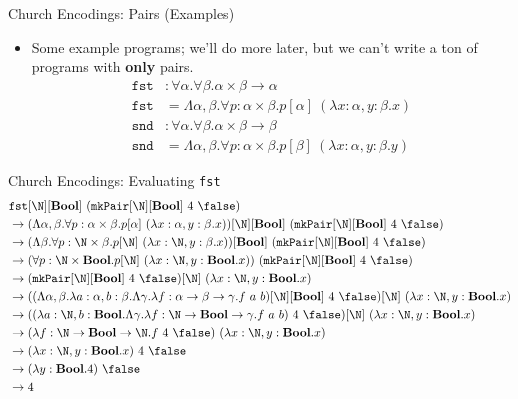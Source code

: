\documentclass[leqno,presentation,usenames,dvipsnames]{beamer}
\newcommand{\bool}{\textbf{Bool}}
\begin{document}
\begin{frame}[fragile]{Church Encodings: Pairs (Examples)}
    \begin{itemize}
        \item Some example programs; we'll do more later, but we can't write a ton of programs with \textbf{only} pairs.
\begin{align*}
    \texttt{fst} & : \forall \alpha. \forall \beta. \alpha \times \beta \to \alpha \\
    \texttt{fst} & = \Lambda \alpha, \beta. \forall p : \alpha \times \beta. p[\alpha]~(\lambda x : \alpha, y : \beta. x) \\
    \texttt{snd} & : \forall \alpha. \forall \beta. \alpha \times \beta \to \beta \\
    \texttt{snd} & = \Lambda \alpha, \beta. \forall p : \alpha \times \beta. p[\beta]~(\lambda x : \alpha, y : \beta. y)
\end{align*}
    \end{itemize}
\end{frame}

\begin{frame}{Church Encodings: Evaluating \texttt{fst}}
\footnotesize
\begin{align*}
    &\texttt{fst}[\N][\bool]~(\texttt{mkPair}[\N][\bool]~4~\false) \\
    & \to (\Lambda \alpha, \beta. \forall p : \alpha \times \beta. p[\alpha]~(\lambda x : \alpha, y : \beta. x))[\N][\bool]~(\texttt{mkPair}[\N][\bool]~4~\false) \\
    & \to (\Lambda \beta. \forall p : \N \times \beta. p[\N]~(\lambda x : \N, y : \beta. x))[\bool]~(\texttt{mkPair}[\N][\bool]~4~\false) \\
    & \to (\forall p : \N \times \bool. p[\N]~(\lambda x : \N, y : \bool. x))~(\texttt{mkPair}[\N][\bool]~4~\false) \\
    & \to (\texttt{mkPair}[\N][\bool]~4~\false)[\N]~(\lambda x : \N, y : \bool. x) \\
    & \to ((\Lambda \alpha, \beta. \lambda a : \alpha, b : \beta. \Lambda \gamma. \lambda f : \alpha \to \beta \to \gamma. f~a~b)[\N][\bool]~4~\false)[\N]~(\lambda x : \N, y : \bool. x) \\
    & \to ((\lambda a : \N, b : \bool. \Lambda \gamma. \lambda f : \N \to \bool \to \gamma. f~a~b)~4~\false)[\N]~(\lambda x : \N, y : \bool. x) \\
    & \to (\lambda f : \N \to \bool \to \N. f~4~\false)~(\lambda x : \N, y : \bool. x) \\
    & \to (\lambda x : \N, y : \bool. x)~4~\false \\
    & \to (\lambda y : \bool. 4)~\false \\
    & \to 4 \\
\end{align*}
\end{frame}
\end{document}
